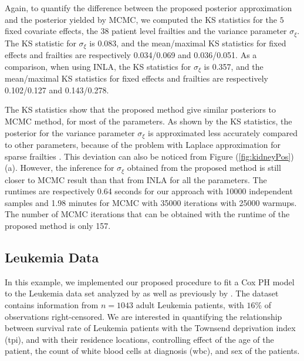 \documentclass[ba]{imsart}
\begin{document}
  
Again, to quantify the difference between the proposed posterior approximation and the posterior yielded by MCMC, we computed the KS statistics for the $5$ fixed covariate effects, the $38$ patient level frailties and the variance parameter $\sigma_\xi$. The KS statistic for $\sigma_\xi$ is 0.083, and the mean/maximal KS statistics for fixed effects and frailties are respectively 0.034/0.069 and 0.036/0.051. 
As a comparison, when using INLA, the KS statistics for $\sigma_\xi$ is 0.357, and the mean/maximal KS statistics for fixed effects and frailties are respectively 0.102/0.127 and 0.143/0.278.

The KS statistics show that the proposed method give similar posteriors to MCMC method, for most of the parameters. As shown by the KS statistics, the posterior for the variance parameter $\sigma_\xi$ is approximated less accurately compared to other parameters, because of the problem with Laplace approximation for sparse frailties \citep{Ogden2013ASR}. This deviation can also be noticed from Figure (\ref{fig:kidneyPos})(a). However, the inference for $\sigma_\xi$ obtained from the proposed method is still closer to MCMC result than that from INLA for all the parameters. The runtimes are respectively 0.64 seconds for our approach with 10000 independent samples and 1.98 minutes for MCMC with 35000 iterations with 25000 warmups. The number of MCMC iterations that can be obtained with the runtime of the proposed method is only 157.



\subsection{Leukemia Data}\label{subsec:leuk}

In this example, we implemented our proposed procedure to fit a Cox PH model to the Leukemia data set analyzed by \cite{inlacoxph} as well as previously by \cite{spde,leukaemia}. The dataset contains information from $n=1043$ adult Leukemia patients, with $16\%$ of observations right-censored. We are interested in quantifying the relationship between survival rate of Leukemia patients with the Townsend deprivation index (tpi), and with their residence locations, controlling effect of the age of the patient, the count of white blood cells at diagnosis (wbc), and sex of the patients.
\end{document}
